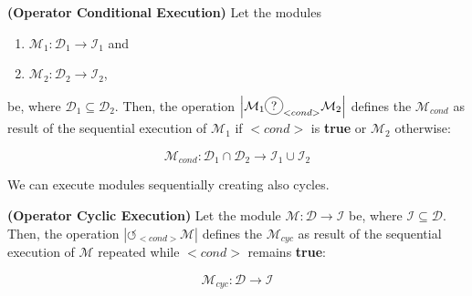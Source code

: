 \begin{definition}\label{op:conditional}
{\bf (Operator Conditional Execution)} Let the modules 
\begin{enumerate}%
	\item $\mathcal{M}_1 : \mathcal{D}_1 \rightarrow \mathcal{I}_1$ and  
	\item $\mathcal{M}_2 : \mathcal{D}_2 \rightarrow \mathcal{I}_2$,
\end{enumerate}%
be, where $\mathcal{D}_1 \subseteq \mathcal{D}_2$. %
Then, the operation $\left|\mathcal{M}_1\circled{?}_{<cond>}\mathcal{M}_2\right|$ defines the \cm{} $\mathcal{M}_{cond}$ as result of the sequential execution of $\mathcal{M}_1$ if $<cond>$ is {\bf true} or $\mathcal{M}_2$ otherwise:

\[
\mathcal{M}_{cond}:\mathcal{D}_1\cap\mathcal{D}_2 \rightarrow \mathcal{I}_1 \cup \mathcal{I}_2 
\]
\end{definition}

We can execute modules sequentially creating also cycles.

\begin{definition}\label{op:cyclic}
{\bf (Operator Cyclic Execution)} Let the module $\mathcal{M} : \mathcal{D} \rightarrow \mathcal{I}$ be, where $\mathcal{I} \subseteq \mathcal{D}$. Then, the operation $\left|\circlearrowleft_{<cond>}\mathcal{M}\right|$ defines the \cm{} $\mathcal{M}_{cyc}$ as result of the sequential execution of $\mathcal{M}$ repeated while $<cond>$ remains {\bf true}:

\[
\mathcal{M}_{cyc}:\mathcal{D} \rightarrow \mathcal{I} 
\]
\end{definition}

%
%	
%
%


